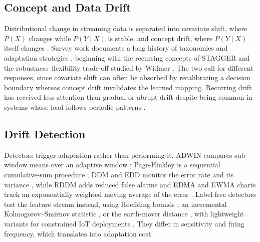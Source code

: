 \documentclass[conference]{IEEEtran}
\begin{document}
\subsection{Concept and Data Drift}
Distributional change in streaming data is separated into covariate shift, where
$P(X)$ changes while $P(Y\mid X)$ is stable, and concept drift, where $P(Y\mid X)$
itself changes \cite{gama2014survey,lu2018learning}. Survey work documents a long
history of taxonomies and adaptation strategies \cite{khamassi2018discussion},
beginning with the recurring concepts of STAGGER \cite{schlimmer1986incremental} and
the robustness--flexibility trade-off studied by Widmer \cite{widmer1994combining}.
The two call for different responses, since covariate shift can often be absorbed by
recalibrating a decision boundary whereas concept drift invalidates the learned
mapping. Recurring drift has received less attention than gradual or abrupt drift
despite being common in systems whose load follows periodic patterns
\cite{gomes2017adaptive}.

\subsection{Drift Detection}
Detectors trigger adaptation rather than performing it. ADWIN compares sub-window
means over an adaptive window \cite{bifet2007learning}; Page-Hinkley is a sequential
cumulative-sum procedure \cite{page1954continuous}; DDM and EDD monitor the error rate
and its variance \cite{gama2004learning,baena2006early}, while RDDM adds reduced false
alarms \cite{barros2017rddm} and EDMA and EWMA charts track an exponentially weighted
moving average of the error \cite{ross2012exponentially}. Label-free detectors test the feature stream instead,
using Hoeffding bounds \cite{frias2014online}, an incremental Kolmogorov--Smirnov
statistic \cite{dos2016fast}, or the earth-mover distance \cite{brockhoff2020time},
with lightweight variants for constrained IoT deployments \cite{9427288}. They
differ in sensitivity and firing frequency, which translates into adaptation cost.
\end{document}
